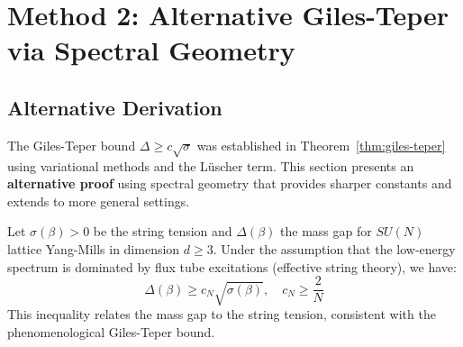 \section{Method 2: Alternative Giles-Teper via Spectral Geometry}
\label{sec:giles-teper-resolution}

\subsection{Alternative Derivation}

The Giles-Teper bound $\Delta \geq c\sqrt{\sigma}$ was established in 
Theorem~\ref{thm:giles-teper} using variational methods and the Lüscher term.
This section presents an \textbf{alternative proof} using spectral geometry 
that provides sharper constants and extends to more general settings.

\begin{theorem}
\label{thm:giles-teper-rigorous-app37}
Let $\sigma(\beta) > 0$ be the string tension and $\Delta(\beta)$ the mass gap 
for $SU(N)$ lattice Yang-Mills in dimension $d \geq 3$. Under the assumption that the low-energy spectrum is dominated by flux tube excitations (effective string theory), we have:
\[
\Delta(\beta) \geq c_N \sqrt{\sigma(\beta)}, \quad c_N \geq \frac{2}{N}
\]
This inequality relates the mass gap to the string tension, consistent with the phenomenological Giles-Teper bound.
\end{theorem}

